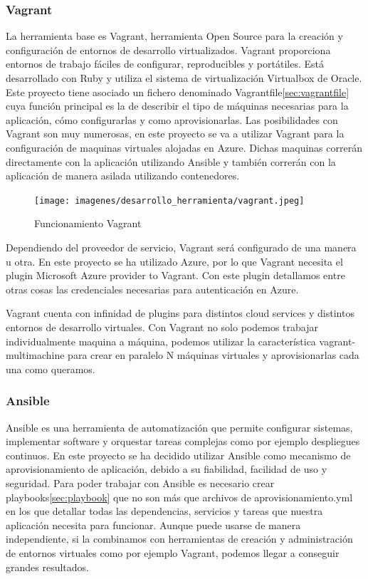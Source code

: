 \documentclass[a4paper,11pt]{book}
\begin{document}
\subsubsection{Vagrant}

La herramienta base es Vagrant\cite{vg}, herramienta Open Source para la creación y configuración de entornos de desarrollo virtualizados. Vagrant proporciona entornos de trabajo fáciles de configurar, reproducibles y portátiles. Está desarrollado con Ruby y utiliza el sistema de virtualización Virtualbox de Oracle. Este proyecto tiene asociado un fichero denominado Vagrantfile\ref{sec:vagrantfile} cuya función principal es la de describir el tipo de máquinas necesarias para la aplicación, cómo configurarlas y como aprovisionarlas. Las posibilidades con Vagrant son muy numerosas, en este proyecto se va a utilizar Vagrant para la configuración de maquinas virtuales alojadas en Azure. Dichas maquinas correrán directamente con la aplicación utilizando Ansible y también correrán con la aplicación de manera asilada utilizando contenedores. 

\begin{figure}[H] 
\centering 
\texttt{[image: imagenes/desarrollo\_herramienta/vagrant.jpeg]}
\caption{ Funcionamiento Vagrant\cite{vg2}}
\end{figure}


Dependiendo del proveedor de servicio, Vagrant será configurado de una manera u otra. En este proyecto se ha utilizado Azure, por lo que Vagrant necesita el plugin Microsoft Azure provider to Vagrant. Con este plugin detallamos entre otras cosas las credenciales necesarias para autenticación en Azure.

Vagrant cuenta con infinidad de plugins para distintos cloud services y distintos entornos de desarrollo virtuales. Con Vagrant no solo podemos trabajar individualmente maquina a máquina, podemos utilizar la característica vagrant-multimachine para crear en paralelo N máquinas virtuales y aprovisionarlas cada una como queramos. 


\subsubsection{Ansible}

Ansible\cite{ans} es una herramienta de automatización que permite configurar sistemas, implementar software y orquestar tareas complejas como por ejemplo despliegues continuos. En este proyecto se ha decidido utilizar Ansible como mecanismo de aprovisionamiento de aplicación, debido a su fiabilidad, facilidad de uso y seguridad. Para poder trabajar con Ansible es necesario crear playbooks\ref{sec:playbook} que no son más que archivos de aprovisionamiento.yml en los que detallar todas las dependencias, servicios y tareas que nuestra aplicación necesita para funcionar. Aunque puede usarse de manera independiente, si la combinamos con herramientas de creación y administración de entornos virtuales como por ejemplo Vagrant, podemos llegar a conseguir grandes resultados.
\end{document}
